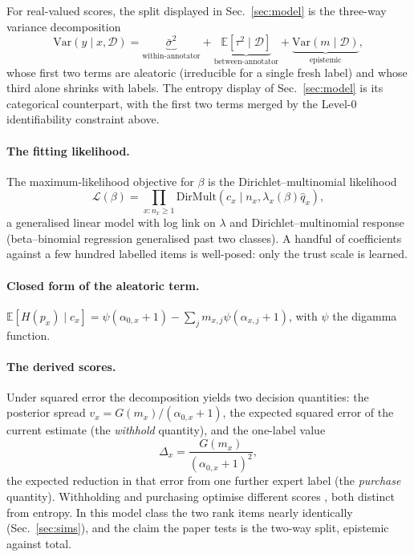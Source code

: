 \documentclass{article}
\newcommand{\secref}[1]{Sec.~\ref{#1}}
\begin{document}
For real-valued scores, the split displayed in \secref{sec:model} is the three-way variance
decomposition
\begin{equation*}
  \mathrm{Var}(y \mid x, \mathcal{D}) =
  \underbrace{\bar\sigma^2}_{\text{within-annotator}} +
  \underbrace{\mathbb{E}[\tau^2 \mid \mathcal{D}]}_{\text{between-annotator}} +
  \underbrace{\mathrm{Var}(m \mid \mathcal{D})}_{\text{epistemic}},
\end{equation*}
whose first two terms are aleatoric (irreducible for a single fresh label) and whose third
alone shrinks with labels. The entropy display of \secref{sec:model} is its categorical
counterpart, with the first two terms merged by the Level-0 identifiability constraint above.

\paragraph{The fitting likelihood.}
The maximum-likelihood objective for $\beta$ is the Dirichlet--multinomial likelihood
\begin{equation*}
  \mathcal{L}(\beta) = \prod_{x: n_x \ge 1}
  \mathrm{DirMult}(c_x \mid n_x, \lambda_x(\beta) \hat q_x),
\end{equation*}
a generalised linear model with log link on $\lambda$ and Dirichlet--multinomial response
(beta--binomial regression generalised past two classes). A handful of
coefficients against a few hundred labelled items is well-posed: only the trust
scale is learned.

\paragraph{Closed form of the aleatoric term.}
$\mathbb{E}[H(p_x) \mid c_x] = \psi(\alpha_{0,x}+1) - \sum_j m_{x,j} \psi(\alpha_{x,j}+1)$,
with $\psi$ the digamma function.

\paragraph{The derived scores.}
Under squared error the decomposition yields two decision quantities: the posterior spread
$v_x = G(m_x)/(\alpha_{0,x}+1)$, the expected squared error of the current estimate (the
\emph{withhold} quantity), and the one-label value
\begin{equation*}
  \Delta_x = \frac{G(m_x)}{(\alpha_{0,x}+1)^2},
\end{equation*}
the expected reduction in that error from one further expert label (the \emph{purchase}
quantity). Withholding and purchasing optimise different scores \citep{bickfordsmith2023},
both distinct from entropy. In this model class the two rank items nearly identically
(\secref{sec:sims}), and the claim the paper tests is the two-way split, epistemic
against total.
\end{document}
